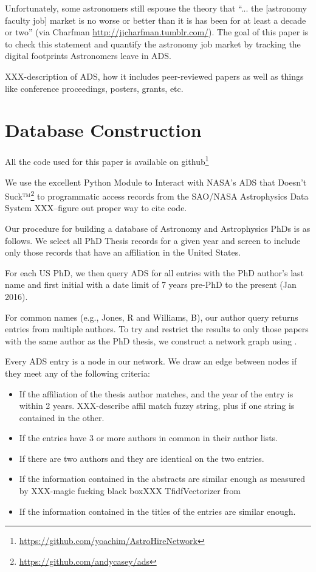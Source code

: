 \documentclass{emulateapj}
\begin{document}
Unfortunately, some astronomers still espouse the theory that ``... the [astronomy faculty job] market is no worse or better than it is has been for at least a decade or two'' (via Charfman \url{http://jjcharfman.tumblr.com/}).  The goal of this paper is to check this statement and quantify the astronomy job market by tracking the digital footprints Astronomers leave in ADS. 

XXX-description of ADS, how it includes peer-reviewed papers as well as things like conference proceedings, posters, grants, etc.

\section{Database Construction}

All the code used for this paper is available on github\footnote{\url{https://github.com/yoachim/AstroHireNetwork}}

We use the excellent Python Module to Interact with NASA's ADS that Doesn't Suck™\footnote{\url{https://github.com/andycasey/ads}} to programmatic access records from the SAO/NASA Astrophysics Data System XXX--figure out proper way to cite code. 

Our procedure for building a database of Astronomy and Astrophysics PhDs is as follows.  We select all PhD Thesis records for a given year and screen to include only those records that have an affiliation in the United States.

For each US PhD, we then query ADS for all entries with the PhD author's last name and first initial with a date limit of 7 years pre-PhD to the present (Jan 2016).

For common names (e.g., Jones, R and Williams, B), our author query returns entries from multiple authors.  To try and restrict the results to only those papers with the same author as the PhD thesis, we construct a network graph using \citet{networkx}.

Every ADS entry is a node in our network. We draw an edge between nodes if they meet any of the following criteria:
\begin{itemize}
\item{If the affiliation of the thesis author matches, and the year of the entry is within 2 years. XXX-describe affil match fuzzy string, plus if one string is contained in the other.}
\item{If the entries have 3 or more authors in common in their author lists.}
\item{If there are two authors and they are identical on the two entries.}
\item{If the information contained in the abstracts are similar enough as measured by XXX-magic fucking black boxXXX TfidfVectorizer from \citet{scikit-learn}}
  \item{If the information contained in the titles of the entries are similar enough.}
\end{itemize}
\end{document}

